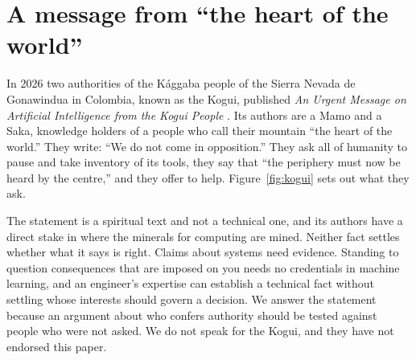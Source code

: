 \documentclass[10pt,twocolumn,letterpaper]{article}
\theoremstyle{definition}
\begin{document}
\section{A message from ``the heart of the world''}
\label{sec:kogui}

In 2026 two authorities of the K\'aggaba people of the Sierra Nevada de Gonawindua in Colombia, known as the Kogui, published \emph{An Urgent Message on Artificial Intelligence from the Kogui People} \cite{kogui}. Its authors are a Mamo and a Saka, knowledge holders of a people who call their mountain ``the heart of the world.'' They write: ``We do not come in opposition.'' They ask all of humanity to pause and take inventory of its tools, they say that ``the periphery must now be heard by the centre,'' and they offer to help. Figure~\ref{fig:kogui} sets out what they ask.

The statement is a spiritual text and not a technical one, and its authors have a direct stake in where the minerals for computing are mined. Neither fact settles whether what it says is right. Claims about systems need evidence. Standing to question consequences that are imposed on you needs no credentials in machine learning, and an engineer's expertise can establish a technical fact without settling whose interests should govern a decision. We answer the statement because an argument about who confers authority should be tested against people who were not asked. We do not speak for the Kogui, and they have not endorsed this paper.
\end{document}
